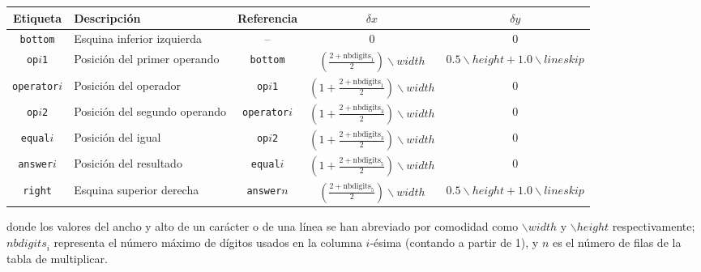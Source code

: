 \documentclass[svgnames,addpoints]{exam}
\begin{document}
\begin{center}
  \begin{tabular}{c|p{2.0cm}|c|c|c}
    Etiqueta & Descripción & Referencia & $\delta x$ & $\delta y$ \\ \toprule
    \texttt{bottom} & Esquina inferior izquierda & -- & 0 & 0 \\ \midrule
    \texttt{op}$i$\texttt{1} & Posición del primer operando & \texttt{bottom}&  $\left(\frac{2+\textrm{nbdigits}_{1}}{2}\right)\backslash\mathit{width}$ & $0.5\backslash\mathit{height}+1.0\backslash lineskip$ \\  \midrule
    \texttt{operator}$i$ & Posición del operador & \texttt{op}$i$\texttt{1} & $\left(1+\frac{2+\textrm{nbdigits}_{1}}{2}\right)\backslash\mathit{width}$ & 0 \\  \midrule
    \texttt{op}$i$\texttt{2} & Posición del segundo operando & \texttt{operator}$i$ & $\left(1+\frac{2+\textrm{nbdigits}_{3}}{2}\right)\backslash\mathit{width}$ & 0 \\  \midrule
    \texttt{equal}$i$ & Posición del igual & \texttt{op}$i$\texttt{2} & $\left(1+\frac{2+\textrm{nbdigits}_{3}}{2}\right)\backslash\mathit{width}$ & 0 \\  \midrule
    \texttt{answer}$i$ & Posición del resultado & \texttt{equal}$i$ & $\left(1+\frac{2+\textrm{nbdigits}_{5}}{2}\right)\backslash\mathit{width}$ & 0 \\  \midrule
    \texttt{right} & Esquina superior derecha & \texttt{answer}$n$ & $\left(\frac{2+\textrm{nbdigits}_{5}}{2}\right)\backslash\mathit{width}$ & $0.5\backslash\mathit{height}+1.0\backslash lineskip$ \\ \bottomrule
  \end{tabular}
\end{center}

\noindent
donde los valores del ancho y alto de un carácter o de una línea se han
abreviado por comodidad como $\backslash\mathit{width}$ y
$\backslash\mathit{height}$ respectivamente; $\mathit{nbdigits}_{i}$ representa
el número máximo de dígitos usados en la columna $i$-ésima (contando a partir de
1), y $n$ es el número de filas de la tabla de multiplicar.
\end{document}
